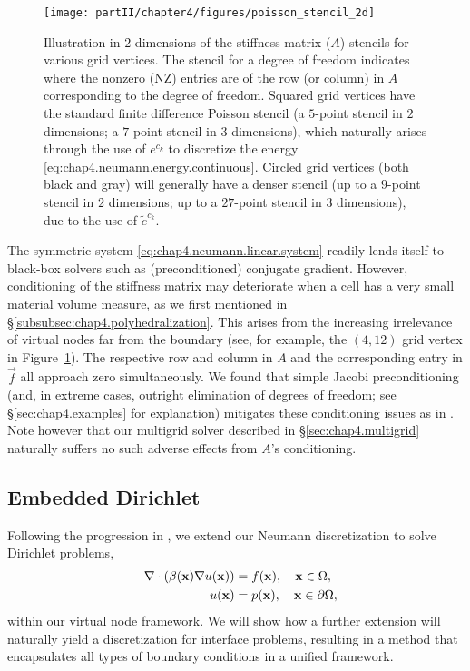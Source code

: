 \setlength{\figurewidth}{\textwidth}
\begin{figure}[htb]
\centering
\texttt{[image: partII/chapter4/figures/poisson\_stencil\_2d]}
\caption{Illustration in $2$ dimensions of the stiffness matrix ($A$) stencils for various grid vertices. The stencil for a degree of freedom indicates where the nonzero (NZ) entries are of the row (or column) in $A$ corresponding to the degree of freedom. Squared grid vertices have the standard finite difference Poisson stencil (a $5$-point stencil in $2$ dimensions; a $7$-point stencil in $3$ dimensions), which naturally arises through the use of $e^{c_k}$ to discretize the energy \eqref{eq:chap4.neumann.energy.continuous}. Circled grid vertices (both black and gray) will generally have a denser stencil (up to a $9$-point stencil in $2$ dimensions; up to a $27$-point stencil in $3$ dimensions), due to the use of $\tilde{e}^{c_k}$.}
\label{fig:chap4.poisson.stencil}
\end{figure}

The symmetric system \eqref{eq:chap4.neumann.linear.system} readily lends itself to black-box solvers such as (preconditioned) conjugate gradient. However, conditioning of the stiffness matrix may deteriorate when a cell has a very small material volume measure, as we first mentioned in \S\ref{subsubsec:chap4.polyhedralization}. This arises from the increasing irrelevance of virtual nodes far from the boundary (see, for example, the $(4,12)$ grid vertex in Figure~\ref{fig:chap4.poisson.stencil}). The respective row and column in $A$ and the corresponding entry in $\vec{f}$ all approach zero simultaneously. We found that simple Jacobi preconditioning (and, in extreme cases, outright elimination of degrees of freedom; see \S\ref{sec:chap4.examples} for explanation) mitigates these conditioning issues as in \cite{Bedrossian10}. Note however that our multigrid solver described in \S\ref{sec:chap4.multigrid} naturally suffers no such adverse effects from $A$'s conditioning.

\subsection{Embedded Dirichlet} \label{subsec:chap4.discretization.dirichlet}

Following the progression in \cite{Bedrossian10}, we extend our Neumann discretization to solve Dirichlet problems,
\begin{equation} \label{eq:chap4.dirichlet}
\begin{split}
-\nabla \cdot \left( \beta(\mathbf{x}) \nabla u(\mathbf{x}) \right) & = f(\mathbf{x}), \quad  \mathbf{x} \in \Omega, \\
u(\mathbf{x}) & = p(\mathbf{x}), \quad \mathbf{x} \in \partial\Omega,
\end{split}
\end{equation}
within our virtual node framework. We will show how a further extension will naturally yield a discretization for interface problems, resulting in a method that encapsulates all types of boundary conditions in a unified framework.

